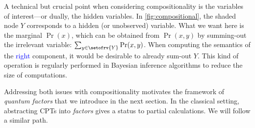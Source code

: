 \begin{remark}
\label{rem:marginals}
A technical but crucial point when considering compositionality is the variables of interest---or dually, the hidden variables.
In \cref{fig:compositional}, the shaded node $Y$ corresponds to a hidden (or unobserved) variable.
What we want here is the marginal $\Pr(x)$, which can be obtained from $\Pr(x,y)$ by summing-out the irrelevant variable: $\sum_{y \in \setofrv{Y}} \Pr(x,y)$.
When computing the semantics of the \textcolor{blue}{right} component, it would be desirable to already sum-out $Y$.
This kind of operation is regularly performed in Bayesian inference algorithms to reduce the size of computations.
\end{remark}

Addressing both issues with compositionality motivates the framework of \emph{quantum factors} that we introduce in the next section.
In the classical setting, abstracting CPTs into \emph{factors} gives a status to partial calculations. We will follow a similar path.
